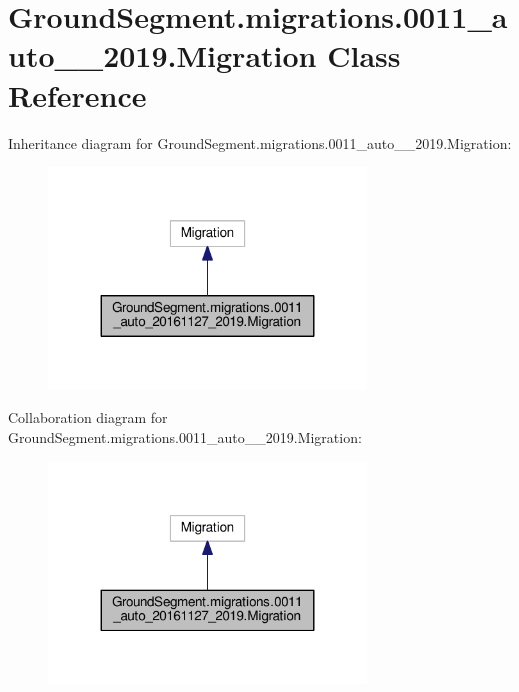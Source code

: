 \hypertarget{class_ground_segment_1_1migrations_1_10011__auto__20161127__2019_1_1_migration}{}\section{Ground\+Segment.\+migrations.0011\+\_\+auto\+\_\+\_\+2019.Migration Class Reference}
\label{class_ground_segment_1_1migrations_1_10011__auto__20161127__2019_1_1_migration}


Inheritance diagram for Ground\+Segment.\+migrations.0011\+\_\+auto\+\_\+\_\+2019.Migration\+:\nopagebreak
\begin{figure}[H]
\begin{center}
\leavevmode
\includegraphics[width=239pt]{class_ground_segment_1_1migrations_1_10011__auto__20161127__2019_1_1_migration__inherit__graph}
\end{center}
\end{figure}


Collaboration diagram for Ground\+Segment.\+migrations.0011\+\_\+auto\+\_\+\_\+2019.Migration\+:\nopagebreak
\begin{figure}[H]
\begin{center}
\leavevmode
\includegraphics[width=239pt]{class_ground_segment_1_1migrations_1_10011__auto__20161127__2019_1_1_migration__coll__graph}
\end{center}
\end{figure}
